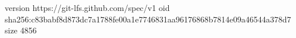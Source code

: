 version https://git-lfs.github.com/spec/v1
oid sha256:c83babf8d873dc7a1788fe00a1e7746831aa96176868b7814e09a46544a378d7
size 4856
